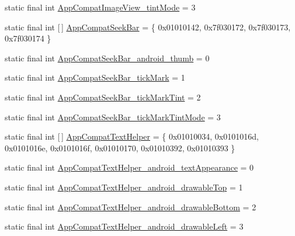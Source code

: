 \begin{DoxyCompactItemize}
static final int \mbox{\hyperlink{classandroid_1_1support_1_1design_1_1R_1_1styleable_a02bf7aab2a5bce4d266cc7cbe606cbef}{App\+Compat\+Image\+View\+\_\+tint\+Mode}} = 3
\item 
static final int \mbox{[}$\,$\mbox{]} \mbox{\hyperlink{classandroid_1_1support_1_1design_1_1R_1_1styleable_a0b82f9f41bab884666776b93fa48c45d}{App\+Compat\+Seek\+Bar}} = \{ 0x01010142, 0x7f030172, 0x7f030173, 0x7f030174 \}
\item 
static final int \mbox{\hyperlink{classandroid_1_1support_1_1design_1_1R_1_1styleable_a53b48c25cfd19170a2bcac5f1ba26cd3}{App\+Compat\+Seek\+Bar\+\_\+android\+\_\+thumb}} = 0
\item 
static final int \mbox{\hyperlink{classandroid_1_1support_1_1design_1_1R_1_1styleable_abfa9ef12874a75eee605e31ef5215253}{App\+Compat\+Seek\+Bar\+\_\+tick\+Mark}} = 1
\item 
static final int \mbox{\hyperlink{classandroid_1_1support_1_1design_1_1R_1_1styleable_ae8d45777356092f2bda7f9421518d2fb}{App\+Compat\+Seek\+Bar\+\_\+tick\+Mark\+Tint}} = 2
\item 
static final int \mbox{\hyperlink{classandroid_1_1support_1_1design_1_1R_1_1styleable_a28d6c186a45529a5fc744a63d0e7e453}{App\+Compat\+Seek\+Bar\+\_\+tick\+Mark\+Tint\+Mode}} = 3
\item 
static final int \mbox{[}$\,$\mbox{]} \mbox{\hyperlink{classandroid_1_1support_1_1design_1_1R_1_1styleable_a1d1ff91d6ee58f549f28fb6643db5d60}{App\+Compat\+Text\+Helper}} = \{ 0x01010034, 0x0101016d, 0x0101016e, 0x0101016f, 0x01010170, 0x01010392, 0x01010393 \}
\item 
static final int \mbox{\hyperlink{classandroid_1_1support_1_1design_1_1R_1_1styleable_a126c42fd3493b95aa5ee09c6eb327840}{App\+Compat\+Text\+Helper\+\_\+android\+\_\+text\+Appearance}} = 0
\item 
static final int \mbox{\hyperlink{classandroid_1_1support_1_1design_1_1R_1_1styleable_a2e986baeb1b1471188e668c9241f57fc}{App\+Compat\+Text\+Helper\+\_\+android\+\_\+drawable\+Top}} = 1
\item 
static final int \mbox{\hyperlink{classandroid_1_1support_1_1design_1_1R_1_1styleable_a6feb8457dde1e62796e1e068697d5131}{App\+Compat\+Text\+Helper\+\_\+android\+\_\+drawable\+Bottom}} = 2
\item 
static final int \mbox{\hyperlink{classandroid_1_1support_1_1design_1_1R_1_1styleable_a9975608d4bce578013e599668a70a11f}{App\+Compat\+Text\+Helper\+\_\+android\+\_\+drawable\+Left}} = 3
\item 

\end{DoxyCompactItemize}
